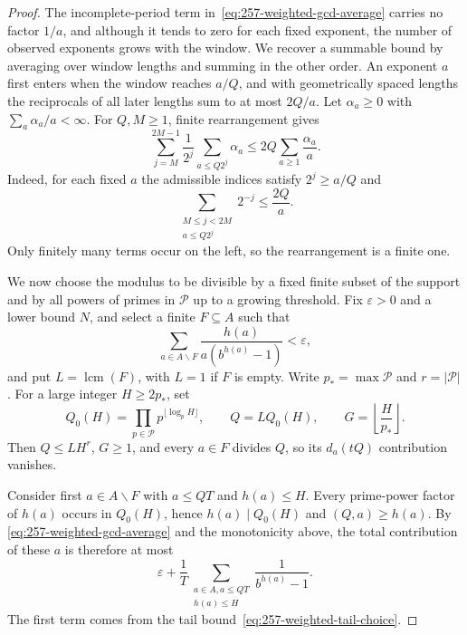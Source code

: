 \documentclass[11pt]{article}
\theoremstyle{plain}
\theoremstyle{definition}
\theoremstyle{remark}
\begin{document}
\begin{proof}
The incomplete-period term in~\eqref{eq:257-weighted-gcd-average}
carries no factor $1/a$, and although it tends to zero for each fixed
exponent, the number of observed exponents grows with the window. We
recover a summable bound by averaging over window lengths and summing in
the other order. An exponent $a$ first enters when the window reaches
$a/Q$, and with geometrically spaced lengths the reciprocals of all later
lengths sum to at most $2Q/a$. Let $\alpha_a\ge0$ with
$\sum_a\alpha_a/a<\infty$. For $Q,M\ge1$, finite rearrangement gives
\begin{equation}\label{eq:257-weighted-dyadic-average}
 \sum_{j=M}^{2M-1}\frac1{2^j}
       \sum_{a\le Q2^j}\alpha_a
 \le 2Q\sum_{a\ge1}\frac{\alpha_a}{a}.
\end{equation}
Indeed, for each fixed $a$ the admissible indices satisfy $2^j\ge a/Q$ and
\[
 \sum_{\substack{M\le j<2M\\a\le Q2^j}}2^{-j}\le\frac{2Q}{a}.
\]
Only finitely many terms occur on the left, so the rearrangement is a
finite one.

We now choose the modulus to be divisible by a fixed finite subset
of the support and by all powers of primes in $\mathcal P$ up to a
growing threshold. Fix $\varepsilon>0$ and a lower bound $N$, and select
a finite $F\subseteq A$ such that
\begin{equation}\label{eq:257-weighted-tail-choice}
 \sum_{a\in A\mathbin{\backslash} F}
 \frac{h(a)}{a(b^{h(a)}-1)}<\varepsilon,
\end{equation}
and put $L=\operatorname{lcm}(F)$, with $L=1$ if $F$ is empty.  Write
$p_*=\max\mathcal P$ and $r=|\mathcal P|$.  For a large integer $H\ge2p_*$,
set
\[
 Q_0(H)=\prod_{p\in\mathcal P}p^{\lfloor\log_pH\rfloor},
 \qquad Q=LQ_0(H),
 \qquad G=\left\lfloor\frac H{p_*}\right\rfloor.
\]
Then $Q\le LH^r$, $G\ge1$, and every $a\in F$ divides $Q$, so its
$d_a(tQ)$ contribution vanishes.

Consider first $a\in A\mathbin{\backslash} F$ with $a\le QT$ and $h(a)\le H$.
Every prime-power factor of $h(a)$ occurs in $Q_0(H)$, hence
$h(a)\mid Q_0(H)$ and $(Q,a)\ge h(a)$. By
\eqref{eq:257-weighted-gcd-average} and the monotonicity above, the total
contribution of these $a$ is therefore at most
\begin{equation}\label{eq:257-weighted-small-part}
 \varepsilon+
 \frac1T\sum_{\substack{a\in A, a\le QT\\h(a)\le H}}
 \frac1{b^{h(a)}-1}.
\end{equation}
The first term comes from the tail bound~\eqref{eq:257-weighted-tail-choice}.


\end{proof}
\end{document}
